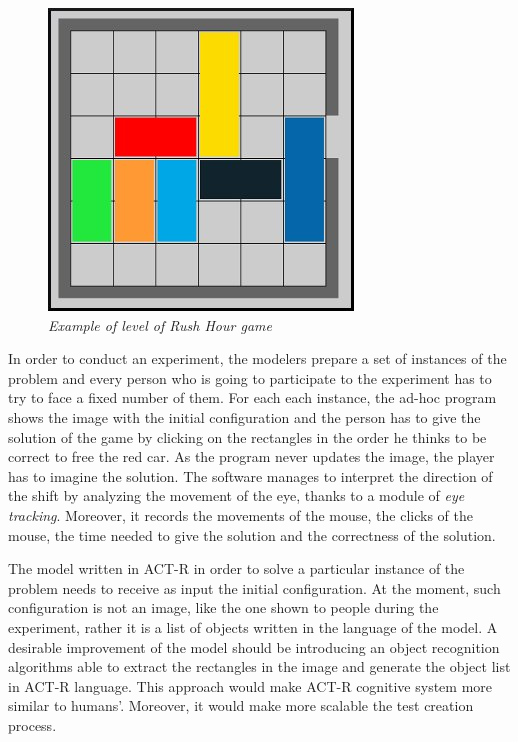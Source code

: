 	\begin{figure}[!h]
	  \begin{center} 
	    \includegraphics[scale=0.6]{images/ch_03/originale.jpg}	
	  \end{center} 
	  \caption{\textit{Example of level of Rush Hour game}}
	  \label{fig:RushHourHuman}	
  	\end{figure}
	
	In order to conduct an experiment, the modelers prepare a set of instances of the problem and every person who is going to participate to the experiment has to try to face a fixed number of them.
	For each each instance, the ad-hoc program shows the image with the initial configuration and the person has to give the solution of the game by clicking on the rectangles in the order he thinks to be correct to free the red car. As the program never updates the image, the player has to imagine the solution. The software manages to interpret the direction of the shift by analyzing the movement of the eye, thanks to a module of \emph{eye tracking}. Moreover, it records the movements of the mouse, the clicks of the mouse, the time needed to give the solution and the correctness of the solution. 

	The model written in ACT-R in order to solve a particular instance of the problem needs to receive as input the initial configuration. At the moment, such configuration is not an image, like the one shown to people during the experiment, rather it is a list of objects written in the language of the model.
	A desirable improvement of the model should be introducing an object recognition algorithms able to extract the rectangles in the image and generate the object list in ACT-R language. 
	This approach would make ACT-R cognitive system more similar to humans'. Moreover, it would make more scalable the test creation process. 


